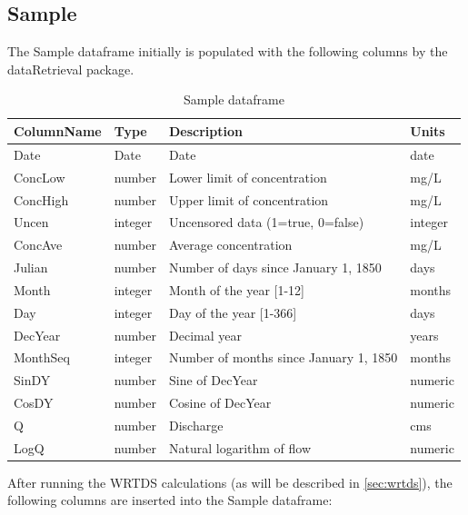 \documentclass[a4paper,11pt]{article}
\begin{document}
\subsection{Sample}
\label{sec:dataframesSample}
The Sample dataframe initially is populated with the following columns by the dataRetrieval package.

\begin{table}[!ht]
\begin{center}
\caption{Sample dataframe}
\label{table:Sample1}
\begin{tabular}{llll}
  \hline
ColumnName & Type & Description & Units \\ 
  \hline
Date & Date & Date & date \\ 
  ConcLow & number & Lower limit of concentration & mg/L \\ 
  ConcHigh & number & Upper limit of concentration & mg/L \\ 
  Uncen & integer & Uncensored data (1=true, 0=false) & integer \\ 
  ConcAve & number & Average concentration & mg/L \\ 
  Julian & number & Number of days since January 1, 1850 & days \\ 
  Month & integer & Month of the year [1-12] & months \\ 
  Day & integer & Day of the year [1-366] & days \\ 
  DecYear & number & Decimal year & years \\ 
  MonthSeq & integer & Number of months since January 1, 1850 & months \\ 
  SinDY & number & Sine of DecYear & numeric \\ 
  CosDY & number & Cosine of DecYear & numeric \\ 
  Q \footnotemark[1] & number & Discharge & cms \\ 
  LogQ \footnotemark[1] & number & Natural logarithm of flow & numeric \\ 
   \hline
\end{tabular}
\end{center}
\end{table}

After running the WRTDS calculations (as will be described in \ref{sec:wrtds}), the following columns are inserted into the Sample dataframe:
\end{document}
